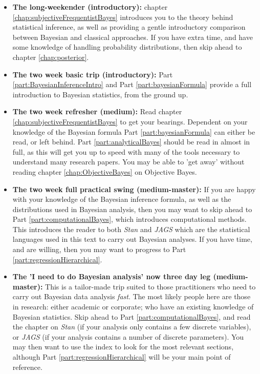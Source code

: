 \documentclass[11pt,fullpage]{book}
\begin{document}
\begin{itemize}
\item \textbf{The long-weekender (introductory):} chapter \ref{chap:subjectiveFrequentistBayes} introduces you to the theory behind statistical inference, as well as providing a gentle introductory comparison between Bayesian and classical approaches. If you have extra time, and have some knowledge of handling probability distributions, then skip ahead to chapter \ref{chap:posterior}.
\item \textbf{The two week basic trip (introductory):} Part \ref{part:BayesianInferenceIntro} and Part \ref{part:bayesianFormula} provide a full introduction to Bayesian statistics, from the ground up. 
\item \textbf{The two week refresher (medium):} Read chapter \ref{chap:subjectiveFrequentistBayes} to get your bearings. Dependent on your knowledge of the Bayesian formula Part \ref{part:bayesianFormula} can either be read, or left behind. Part \ref{part:analyticalBayes} should be read in almost in full, as this will get you up to speed with many of the tools necessary to understand many research papers. You may be able to 'get away' without reading chapter \ref{chap:ObjectiveBayes} on Objective Bayes.
\item \textbf{The two week full practical swing (medium-master):} If you are happy with your knowledge of the Bayesian inference formula, as well as the distributions used in Bayesian analysis, then you may want to skip ahead to Part \ref{part:computationalBayes}, which introduces computational methods. This introduces the reader to both \textit{Stan} and \textit{JAGS} which are the statistical languages used in this text to carry out Bayesian analyses. If you have time, and are willing, then you may want to progress to Part \ref{part:regressionHierarchical}. 
\item \textbf{The 'I need to do Bayesian analysis' now three day leg (medium-master):} This is a tailor-made trip suited to those practitioners who need to carry out Bayesian data analysis \textit{fast}. The most likely people here are those in research: either academic or corporate; who have an existing knowledge of Bayesian statistics. Skip ahead to Part \ref{part:computationalBayes}, and read the chapter on \textit{Stan} (if your analysis only contains a few discrete variables), or \textit{JAGS} (if your analysis contains a number of discrete parameters). You may then want to use the index to look for the most relevant sections, although Part \ref{part:regressionHierarchical} will be your main point of reference.

\end{itemize}
\end{document}
